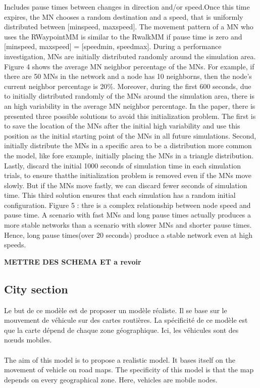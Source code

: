 Includes pause times between changes in direction and/or speed.Once this time expires, the MN chooses a random destination and a speed, that is uniformly distributed between [minspeed, maxspeed]. The movement pattern of a MN who uses the RWaypointMM is similar to the RwalkMM if pause time is zero and [minspeed, maxspeed] = [speedmin, speedmax].
During a performance investigation, MNs are initially distributed randomly around the simulation area. Figure 4 shows the average MN neighbor percentage of the MNs. For example, if there are 50 MNs in the network and a node has 10 neighborns, then the node's current neighbor percentage is 20\%. Moreover, during the first 600 seconds, due to initially distributed randomly of the MNs around the simulation area, there is an high variability in the average MN neighbor percentage.
In the paper, there is presented three possible solutions to avoid this initialization problem. The first is to save the location of the MNs after the initial high variability and use this position as the initial starting point of the MNs in all future simulations. Second, initially distribute the MNs in a specific area to be a distribution more common the model, like fore example, initially placing the MNs in a triangle distribution. Lastly, discard the initial 1000 seconds of simulation time in each simulation trials, to ensure thatthe initialization problem is removed even if the MNs move slowly. But if the MNs move fastly, we can discard fewer seconds of simulation time. This third solution ensures that each simulation has a random initial configuration.
Figure 5 : thre is a complex relationship between node speed and pause time. A scenario with fast MNs and long pause times actually produces a more stable networks than a scenario with slower MNs and shorter pause times. Hence, long pause times(over 20 seconds) produce a stable network even at high speeds.

\textbf{METTRE DES SCHEMA ET a revoir}

\subsection{City section}

Le but de ce modèle est de proposer un modèle réaliste. Il se base sur le mouvement de véhicule sur des cartes routières. La spécificité de ce modèle est que la carte dépend de chaque zone géographique. Ici, les véhicules sont des nœuds mobiles.
\\\\
The aim of this model is to propose a realistic model. It bases itself on the movement of vehicle on road maps. The specificity of this model is that the map depends on every geographical zone. Here, vehicles are mobile nodes.\\\\



